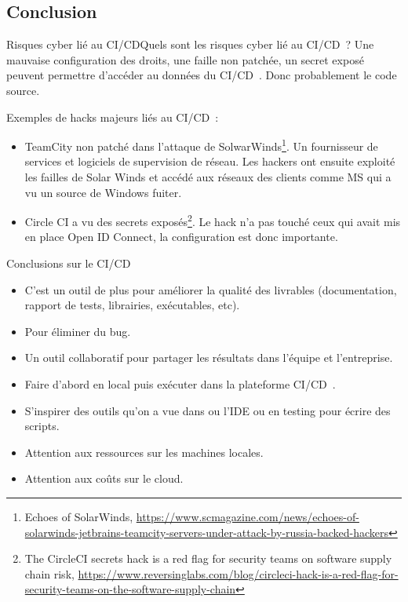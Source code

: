 \documentclass{beamer}
\begin{document}
    \subsection{Conclusion}\label{subsec:conclusion}
    \begin{frame}{Risques cyber lié au CI/CD}{Quels sont les risques cyber lié au CI/CD~?}
        \transdissolve
        \pause
        Une mauvaise configuration des droits, une faille non patchée, un secret exposé peuvent permettre d'accéder au données du CI/CD~.
        Donc probablement le code source.

        Exemples de hacks majeurs liés au CI/CD~:
        \begin{itemize}
            \item TeamCity non patché dans l'attaque de SolwarWinds\footnote{Echoes of SolarWinds, \url{https://www.scmagazine.com/news/echoes-of-solarwinds-jetbrains-teamcity-servers-under-attack-by-russia-backed-hackers}}.
            Un fournisseur de services et logiciels de supervision de réseau.
            Les hackers ont ensuite exploité les failles de Solar Winds et accédé aux réseaux des clients comme MS qui a vu un source de Windows fuiter.
            \item Circle CI a vu des secrets exposés\footnote{The CircleCI secrets hack is a red flag for security teams on software supply chain risk, \url{https://www.reversinglabs.com/blog/circleci-hack-is-a-red-flag-for-security-teams-on-the-software-supply-chain}}.
            Le hack n'a pas touché ceux qui avait mis en place Open ID Connect, la configuration est donc importante.
        \end{itemize}
    \end{frame}

    \begin{frame}{Conclusions sur le CI/CD}
        \transdissolve
        \begin{itemize}
            \item C'est un outil de plus pour améliorer la qualité des livrables (documentation, rapport de tests, librairies, exécutables, etc).
            \item Pour éliminer du bug.
            \item Un outil collaboratif pour partager les résultats dans l'équipe et l'entreprise.
            \item Faire d'abord en local puis exécuter dans la plateforme CI/CD~.
            \item S'inspirer des outils qu'on a vue dans ou l'IDE ou en testing pour écrire des scripts.
            \item Attention aux ressources sur les machines locales.
            \item Attention aux coûts sur le cloud.
        \end{itemize}
    \end{frame}
\end{document}
